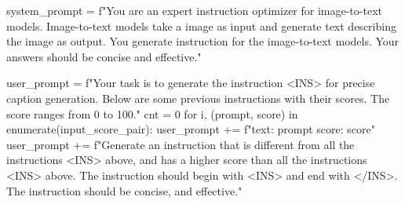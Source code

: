 \begin{python}
system_prompt = f"You are an expert instruction optimizer for image-to-text models. Image-to-text models take a image as input and generate text describing the image as output. You generate instruction for the image-to-text models. Your answers should be concise and effective."
\end{python}

\begin{python}
user_prompt = f"Your task is to generate the instruction <INS> for precise caption generation. Below are some previous instructions with their scores. The score ranges from 0 to 100.\n"
cnt = 0
for i, (prompt, score) in enumerate(input_score_pair):
    user_prompt += f"text:\n
   {prompt} score:\n
   {score}\n"
user_prompt += f"Generate an instruction that is different from all the instructions <INS> above, and has a higher score than all the instructions <INS> above. The instruction should begin with <INS> and end with </INS>. The instruction should be concise, and effective.\n"
\end{python}